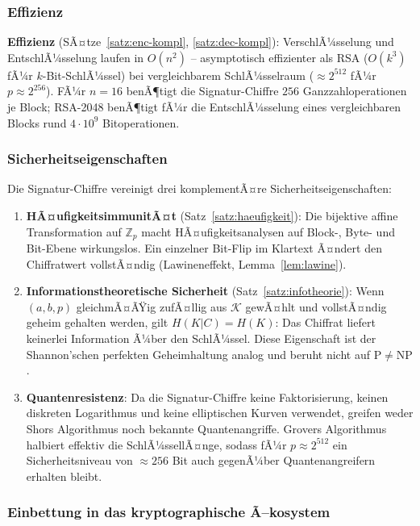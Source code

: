 ﻿\documentclass[a4paper,12pt]{scrreprt}
\theoremstyle{definition}
\begin{document}
\subsubsection{Effizienz}

\textbf{Effizienz} (SÃ¤tze~\ref{satz:enc-kompl}, \ref{satz:dec-kompl}): VerschlÃ¼sselung und EntschlÃ¼sselung laufen in $O(n^2)$ -- asymptotisch effizienter als RSA ($O(k^3)$ fÃ¼r $k$-Bit-SchlÃ¼ssel) bei vergleichbarem SchlÃ¼sselraum ($\approx 2^{512}$ fÃ¼r $p \approx 2^{256}$). FÃ¼r $n=16$ benÃ¶tigt die Signatur-Chiffre $256$ Ganzzahloperationen je Block; RSA-2048 benÃ¶tigt fÃ¼r die EntschlÃ¼sselung eines vergleichbaren Blocks rund $4 \cdot 10^9$ Bitoperationen.

\subsubsection{Sicherheitseigenschaften}

Die Signatur-Chiffre vereinigt drei komplementÃ¤re Sicherheitseigenschaften:

\begin{enumerate}
  \item \textbf{HÃ¤ufigkeitsimmunitÃ¤t} (Satz~\ref{satz:haeufigkeit}): Die bijektive affine Transformation auf $\mathbb{Z}_p$ macht HÃ¤ufigkeitsanalysen auf Block-, Byte- und Bit-Ebene wirkungslos. Ein einzelner Bit-Flip im Klartext Ã¤ndert den Chiffratwert vollstÃ¤ndig (Lawineneffekt, Lemma~\ref{lem:lawine}).
  \item \textbf{Informationstheoretische Sicherheit} (Satz~\ref{satz:infotheorie}): Wenn $(a,b,p)$ gleichmÃ¤ÃŸig zufÃ¤llig aus $\mathcal{K}$ gewÃ¤hlt und vollstÃ¤ndig geheim gehalten werden, gilt $H(K|C) = H(K)$: Das Chiffrat liefert keinerlei Information Ã¼ber den SchlÃ¼ssel. Diese Eigenschaft ist der Shannon'schen perfekten Geheimhaltung analog und beruht nicht auf $\mathrm{P} \neq \mathrm{NP}$.
  \item \textbf{Quantenresistenz}: Da die Signatur-Chiffre keine Faktorisierung, keinen diskreten Logarithmus und keine elliptischen Kurven verwendet, greifen weder Shors Algorithmus \cite{Sho94} noch bekannte Quantenangriffe. Grovers Algorithmus \cite{Gro96} halbiert effektiv die SchlÃ¼ssellÃ¤nge, sodass fÃ¼r $p \approx 2^{512}$ ein Sicherheitsniveau von $\approx 256$ Bit auch gegenÃ¼ber Quantenangreifern erhalten bleibt.
\end{enumerate}

\subsubsection{Einbettung in das kryptographische Ã–kosystem}
\end{document}
